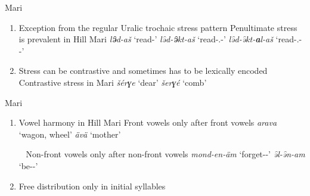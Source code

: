 \documentclass[10 pt, handout]{beamer}
\begin{document}
\begin{frame}{Mari}
	
	\begin{enumerate}[$\gg$]
		\item Exception from the regular Uralic trochaic stress pattern
			\pex Penultimate stress is prevalent in Hill Mari \parencite{krasnova2017}
				\a \emph{l\textbf{ə̑}d-aš} \hfill `read-{\Inf}'
				\a \emph{lə̑d-\textbf{ə̑}kt-aš} \hfill `read-{\Caus}.{\Dst}-{\Inf}'
				\a \emph{lə̑d-ə̑kt-\textbf{a}l-aš} \hfill `read-{\Caus}.{\Dst}-{\Att}-{\Inf}'
			\xe
		\item Stress can be contrastive and sometimes has to be lexically encoded
			\pex Contrastive stress in Mari \parencite{kovedyaeva}
				\a \emph{š{\'e}rɣe} \hfill `dear'
				\a \emph{šerɣ{\'e}} \hfill `comb'
			\xe
	\end{enumerate}
	
\end{frame}

\begin{frame}{Mari}
	
	\begin{enumerate}[$\gg$]
		\item Vowel harmony in Hill Mari 
			\pex Front vowels only after front vowels
				\a \emph{arava} \hfill `wagon, wheel'
				\a \emph{ävä} \hfill `mother'
			\xe
			
			\pex~ Non-front vowels only after non-front vowels
				\a \emph{mond-en-äm} \hfill `forget-{\Pret}-{\Fsg}'
				\a \emph{ə̑l-ə̑n-am} \hfill `be-{\Pret}-{\Fsg}'
			\xe
		\item Free distribution only in initial syllables
	\end{enumerate}
	
\end{frame}

%
%
%
%
%
%
%
%
\end{document}

